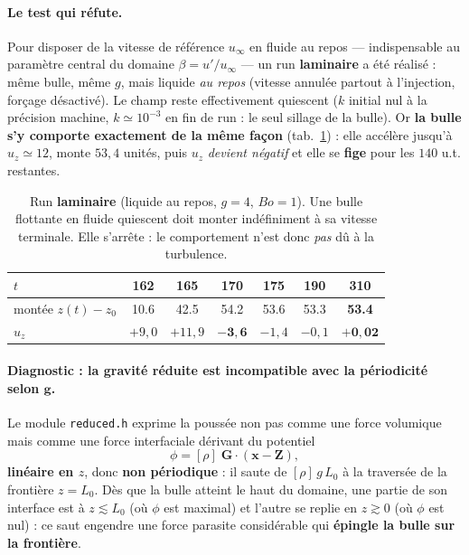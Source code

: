 \paragraph{Le test qui réfute.} Pour disposer de la vitesse de référence $u_\infty$
en fluide au repos --- indispensable au paramètre central du domaine
$\beta = u'/u_\infty$ \cite{legendre2025} --- un run \textbf{laminaire} a été
réalisé : même bulle, même $g$, mais liquide \emph{au repos} (vitesse annulée
partout à l'injection, forçage désactivé). Le champ reste effectivement quiescent
($k$ initial nul à la précision machine, $k\simeq10^{-3}$ en fin de run : le seul
sillage de la bulle). Or \textbf{la bulle s'y comporte exactement de la même
façon} (tab.~\ref{tab:lam_artefact}) : elle accélère jusqu'à $u_z\simeq12$, monte
$53{,}4$ unités, puis $u_z$ \emph{devient négatif} et elle se \textbf{fige} pour
les $140$ u.t. restantes.

\begin{table}[htbp]
    \centering
    \renewcommand{\arraystretch}{1.3}
    \begin{tabular}{lcccccc}
        \toprule
        $t$ & 162 & 165 & 170 & 175 & 190 & 310 \\
        \midrule
        montée $z(t)-z_0$ & 10.6 & 42.5 & 54.2 & 53.6 & 53.3 & \textbf{53.4} \\
        $u_z$ & $+9{,}0$ & $+11{,}9$ & $\mathbf{-3{,}6}$ & $-1{,}4$ & $-0{,}1$ & $\mathbf{+0{,}02}$ \\
        \bottomrule
    \end{tabular}
    \caption{Run \textbf{laminaire} (liquide au repos, $g=4$, $Bo=1$). Une bulle
    flottante en fluide quiescent doit monter indéfiniment à sa vitesse terminale.
    Elle s'arrête : le comportement n'est donc \emph{pas} dû à la turbulence.}
    \label{tab:lam_artefact}
\end{table}

\paragraph{Diagnostic : la gravité réduite est incompatible avec la périodicité
selon $\mathbf{g}$.} Le module \texttt{reduced.h} exprime la poussée non pas comme
une force volumique mais comme une force interfaciale dérivant du potentiel
\begin{equation}
    \phi = [\rho]\;\mathbf{G}\cdot(\mathbf{x}-\mathbf{Z}),
    \label{eq:phi_reduced}
\end{equation}
\textbf{linéaire en $z$}, donc \textbf{non périodique} : il saute de $[\rho]\,g\,L_0$
à la traversée de la frontière $z=L_0$. Dès que la bulle atteint le haut du
domaine, une partie de son interface est à $z\lesssim L_0$ (où $\phi$ est maximal)
et l'autre se replie en $z\gtrsim0$ (où $\phi$ est nul) : ce saut engendre une
force parasite considérable qui \textbf{épingle la bulle sur la frontière}.

